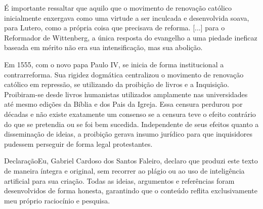\documentclass[
    article,            %
	12pt,				%
	oneside,			%
	a4paper,			%
	chapter=TITLE,		%
	section=TITLE,		%
	english,			%
	french,				%
	spanish,			%
	brazil				%
	]{abntex2}
\begin{document}
\begin{citacao}
É importante ressaltar que aquilo que o movimento de renovação católico inicialmente enxergava como uma virtude a ser inculcada e desenvolvida soava, para Lutero, como a própria coisa que precisava de reforma. [...] para o Reformador de Wittenberg, a única resposta do evangelho a uma piedade ineficaz baseada em mérito não era sua intensificação, mas sua abolição.
\end{citacao}

Em 1555, com o novo papa Paulo IV, se inicia de forma institucional a contrarreforma. Sua rigidez dogmática centralizou o movimento de renovação católico em repressão, se utilizando da proibição de livros e a Inquisição. Proibiram-se desde livros humanistas utilizados amplamente nas universidades até mesmo edições da Bíblia e dos Pais da Igreja. Essa censura perdurou por décadas e não existe exatamente um consenso se a censura teve o efeito contrário do que se pretendia ou se foi bem sucedida. Independente de seus efeitos quanto a disseminação de ideias, a proibição gerava insumo jurídico para que inquisidores pudessem perseguir de forma legal protestantes.
\cleardoublepage

\pagebreak
\noindent Declaração\linebreak Eu, Gabriel Cardoso dos Santos Faleiro, declaro que produzi este texto de maneira íntegra e original, sem recorrer ao plágio ou ao uso de inteligência artificial para sua criação. Todas as ideias, argumentos e referências foram desenvolvidos de forma honesta, garantindo que o conteúdo reflita exclusivamente meu próprio raciocínio e pesquisa.

\pagebreak
\renewcommand{\bibname}{{REFER\^ENCIAS}}


\end{document}
